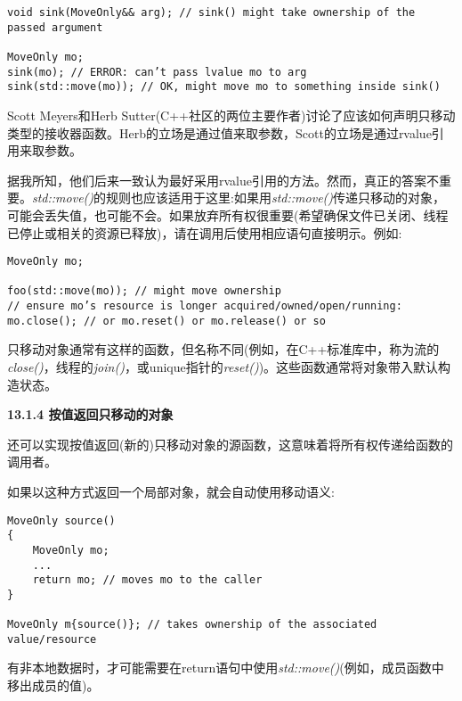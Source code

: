 \begin{lstlisting}[caption={}]
void sink(MoveOnly&& arg); // sink() might take ownership of the passed argument

MoveOnly mo;
sink(mo); // ERROR: can’t pass lvalue mo to arg
sink(std::move(mo)); // OK, might move mo to something inside sink()
\end{lstlisting}

Scott Meyers和Herb Sutter(C++社区的两位主要作者)讨论了应该如何声明只移动类型的接收器函数。Herb的立场是通过值来取参数，Scott的立场是通过rvalue引用来取参数。\par

据我所知，他们后来一致认为最好采用rvalue引用的方法。然而，真正的答案不重要。\textit{std::move()}的规则也应该适用于这里:如果用\textit{std::move()}传递只移动的对象，可能会丢失值，也可能不会。如果放弃所有权很重要(希望确保文件已关闭、线程已停止或相关的资源已释放)，请在调用后使用相应语句直接明示。例如:\par

\begin{lstlisting}[caption={}]
MoveOnly mo;

foo(std::move(mo)); // might move ownership
// ensure mo’s resource is longer acquired/owned/open/running:
mo.close(); // or mo.reset() or mo.release() or so
\end{lstlisting}

只移动对象通常有这样的函数，但名称不同(例如，在C++标准库中，称为流的\textit{close()}，线程的\textit{join()}，或unique指针的\textit{reset()})。这些函数通常将对象带入默认构造状态。\par

\hspace*{\fill} \par %
\textbf{13.1.4 按值返回只移动的对象}

还可以实现按值返回(新的)只移动对象的源函数，这意味着将所有权传递给函数的调用者。\par

如果以这种方式返回一个局部对象，就会自动使用移动语义:\par

\begin{lstlisting}[caption={}]
MoveOnly source()
{
	MoveOnly mo;
	...
	return mo; // moves mo to the caller
}

MoveOnly m{source()}; // takes ownership of the associated value/resource
\end{lstlisting}

有非本地数据时，才可能需要在return语句中使用\textit{std::move()}(例如，成员函数中移出成员的值)。\par

